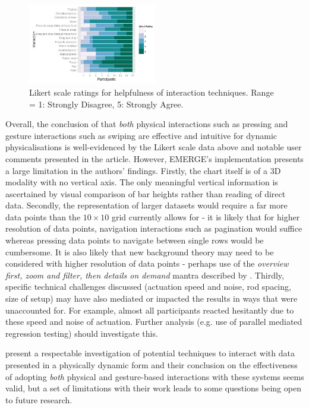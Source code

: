\documentclass[11pt]{article}
\begin{document}
\begin{figure}[H]
\centering
\includegraphics[width=0.5\textwidth]{img/taher2015-likert.png} 
\caption{Likert scale ratings for helpfulness of interaction
techniques. Range = 1: Strongly Disagree, 5: Strongly Agree.}\label{fig:taher2015-likert}
\end{figure}

Overall, the conclusion of \citeauthor{taher2015} that \textit{both} physical interactions such as pressing and 
gesture interactions such as swiping are effective and intuitive for dynamic physicalisations is well-evidenced by the Likert scale data above and notable user comments presented in the article. However, EMERGE's implementation presents a large limitation in the authors' findings. Firstly, the chart itself is of a 3D modality with no vertical axis. The only meaningful vertical information is ascertained by visual comparison of bar heights rather than reading of direct data. Secondly, the representation of larger datasets would require a far more data points than the $10\times10$ grid currently allows for - it is likely that for higher resolution of data points, navigation interactions such as pagination would suffice whereas pressing data points to navigate between single rows would be cumbersome. It is also likely that new background theory may need to be considered with higher resolution of data points - perhaps use of the \textit{overview first, zoom and filter, then details on demand} mantra described by \citet{shneiderman1997}. Thirdly, specific technical challenges discussed (actuation speed and noise, rod spacing, size of setup) may have also mediated or impacted the results in ways that were unaccounted for. For example, almost all participants reacted hesitantly due to these speed and noise of actuation. Further analysis (e.g. use of parallel mediated regression testing) should investigate this.

\citet{taher2015} present a respectable investigation of potential techniques to interact with data presented in a physically dynamic form and their conclusion on the effectiveness of adopting \textit{both} physical and gesture-based interactions with these systems seems valid, but a set of limitations with their work leads to some questions being open to future research. 
\end{document}
